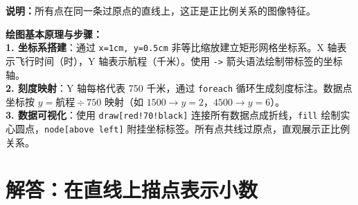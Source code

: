 \begin{center}
\end{center}

\vspace{0.4cm}

{\small\color{gray}
\textbf{说明：}所有点在同一条过原点的直线上，这正是正比例关系的图像特征。}

\vspace{0.6cm}

{\small\color{blue!70!black}
\textbf{绘图基本原理与步骤：}\\
\textbf{1. 坐标系搭建}：通过 \texttt{x=1cm, y=0.5cm} 非等比缩放建立矩形网格坐标系。X 轴表示飞行时间（时），Y 轴表示航程（千米）。使用 \texttt{->} 箭头语法绘制带标签的坐标轴。\\
\textbf{2. 刻度映射}：Y 轴每格代表 750 千米，通过 \texttt{foreach} 循环生成刻度标注。数据点坐标按 $y = \text{航程} \div 750$ 映射（如 $1500 \to y=2$，$4500 \to y=6$）。\\
\textbf{3. 数据可视化}：使用 \texttt{draw[red!70!black]} 连接所有数据点成折线，\texttt{fill} 绘制实心圆点，\texttt{node[above left]} 附挂坐标标签。所有点共线过原点，直观展示正比例关系。
}


\newpage




\newpage

\section{解答：在直线上描点表示小数}


